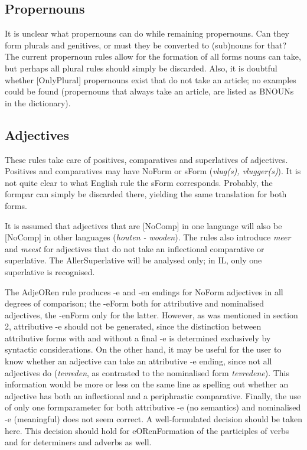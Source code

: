 \subsection{Propernouns}

It is unclear what propernouns can do while remaining propernouns. Can they form 
plurals and genitives, or must they be converted to (sub)nouns for that? The 
current propernoun rules allow for the formation of all forms nouns can take, 
but perhaps all plural rules should simply be discarded. Also, it is doubtful 
whether [OnlyPlural] propernouns exist that do not take an article; no examples 
could be found (propernouns that always take an article, are listed as BNOUNs 
in the dictionary).

\subsection{Adjectives}

These rules take care of positives, comparatives and superlatives of 
adjectives. Positives and comparatives may have NoForm or sForm ({\em vlug(s), 
vlugger(s)}). It is not quite clear to what English rule the sForm corresponds. 
Probably, the formpar can simply be discarded there, yielding the same 
translation for both forms.

It is assumed that adjectives that are [NoComp] in one language 
will also be [NoComp] in other languages ({\em houten - wooden}). The rules 
also introduce {\em meer\/} and {\em meest\/} for adjectives that do not take 
an inflectional comparative or superlative. The AllerSuperlative will be 
analysed only; in IL, only one superlative is recognised.

The AdjeORen rule produces -e and -en endings for NoForm adjectives in all 
degrees of comparison; the -eForm 
both for attributive and nominalised adjectives, the -enForm only for the 
latter. However, as was mentioned in section 2, attributive -e should not be 
generated, since the distinction between attributive forms with and without a 
final -e is 
determined exclusively by syntactic considerations. On the other hand, it may 
be useful for the user to know whether an adjective can take an attributive -e 
ending, since not all adjectives do
({\em tevreden\/}, as contrasted to the 
nominalised form {\em tevredene\/}). This information would be more or less on 
the same line as spelling out whether an adjective has both
an inflectional and a
periphrastic comparative. Finally, the use of only one formparameter
for both attributive -e (no semantics) and nominalised -e (meaningful) does not 
seem correct. 
A well-formulated decision should be taken 
here. This decision should hold for eORenFormation of the participles of verbs 
and for determiners and adverbs as well.

